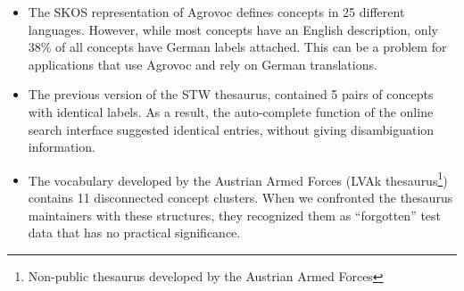 \begin{itemize}

	\item The SKOS representation of Agrovoc defines concepts in 25 different languages. However, while most concepts have an English description, only 38\% of all concepts have German labels attached. This can be a problem for applications that use Agrovoc and rely on German translations.

	\item The previous version of the STW thesaurus, contained 5 pairs of concepts with identical labels. As a result, the auto-complete function of the online search interface suggested identical entries, without giving disambiguation information.


	\item The vocabulary developed by the Austrian Armed Forces (LVAk thesaurus\footnote{Non-public thesaurus developed by the Austrian Armed Forces}) contains 11 disconnected concept clusters. When we confronted the thesaurus maintainers with these structures, they recognized them as ``forgotten'' test data that has no practical significance.
	


\end{itemize}

